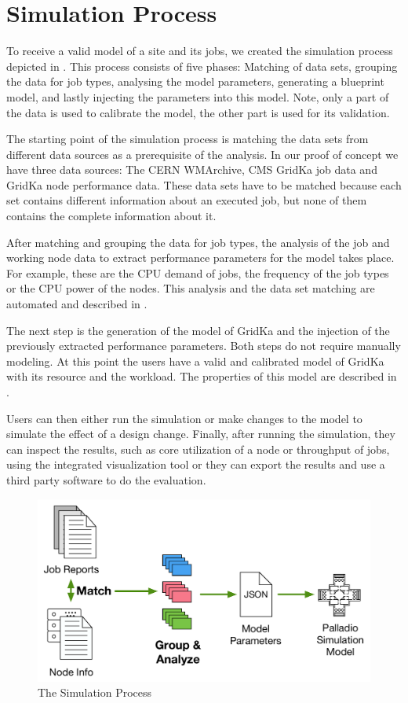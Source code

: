 \documentclass{webofc}
\begin{document}
\section{Simulation Process}
\label{sec:process}
To receive a valid model of a site and its jobs, we created the simulation process depicted in . This process consists of five phases: Matching of data sets, grouping the data for job types, analysing the model parameters, generating a blueprint model, and lastly injecting the parameters into this model. Note, only a part of the data is used to calibrate the model, the other part is used for its validation.

The starting point of the simulation process is matching the data sets from different data sources as a prerequisite  of the analysis. In our proof of concept we have three data sources: The CERN WMArchive, CMS GridKa job data and GridKa node performance data. These data sets have to be matched because each set contains different information about an executed job, but none of them contains the complete information about it.

After matching and grouping the data for job types, the analysis of the job and working node data to extract performance parameters for the model takes place. For example, these are the CPU demand of jobs, the frequency of the job types or the CPU power of the nodes. This analysis and the data set matching are automated and described in .

The next step is the generation of the model of GridKa and the injection of the previously extracted performance parameters. Both steps do not require manually modeling. At this point the users have a valid and calibrated model of GridKa with its resource and the workload. The properties of this model are described in .

Users can then either run the simulation or make changes to the model to simulate the effect of a design change. 
Finally, after running the simulation, they can inspect the results, such as core utilization of a node or throughput of jobs, using the integrated visualization tool or they can export the results and use a third party software to do the evaluation.

\begin{figure}
	\centering
	\includegraphics[width=0.55\linewidth]{images/process}
	\caption[]{The Simulation Process}
	\label{process}
\end{figure}
\end{document}
